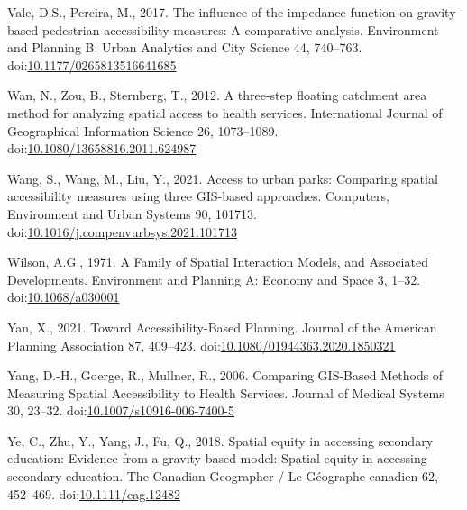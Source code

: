\documentclass[]{elsarticle} %
\newlength{\cslhangindent}
\newlength{\cslentryspacingunit} %
\newenvironment{CSLReferences}[2] %
 {%
  \setlength{\parindent}{0pt}
  \ifodd #1
  \let\oldpar\par
  \def\par{\hangindent=\cslhangindent\oldpar}
  \fi
  \setlength{\parskip}{#2\cslentryspacingunit}
 }%
 {}
\begin{document}
\begin{CSLReferences}{1}{0}
\leavevmode{}%
Vale, D.S., Pereira, M., 2017. The influence of the impedance function
on gravity-based pedestrian accessibility measures: {A} comparative
analysis. Environment and Planning B: Urban Analytics and City Science
44, 740--763.
doi:\href{https://doi.org/10.1177/0265813516641685}{10.1177/0265813516641685}

\leavevmode{}%
Wan, N., Zou, B., Sternberg, T., 2012. A three-step floating catchment
area method for analyzing spatial access to health services.
International Journal of Geographical Information Science 26,
1073--1089.
doi:\href{https://doi.org/10.1080/13658816.2011.624987}{10.1080/13658816.2011.624987}

\leavevmode{}%
Wang, S., Wang, M., Liu, Y., 2021. Access to urban parks: {Comparing}
spatial accessibility measures using three {GIS}-based approaches.
Computers, Environment and Urban Systems 90, 101713.
doi:\href{https://doi.org/10.1016/j.compenvurbsys.2021.101713}{10.1016/j.compenvurbsys.2021.101713}

\leavevmode{}%
Wilson, A.G., 1971. A Family of Spatial Interaction Models, and
Associated Developments. Environment and Planning A: Economy and Space
3, 1--32. doi:\href{https://doi.org/10.1068/a030001}{10.1068/a030001}

\leavevmode{}%
Yan, X., 2021. Toward Accessibility-Based Planning. Journal of the
American Planning Association 87, 409--423.
doi:\href{https://doi.org/10.1080/01944363.2020.1850321}{10.1080/01944363.2020.1850321}

\leavevmode{}%
Yang, D.-H., Goerge, R., Mullner, R., 2006. Comparing {GIS}-{Based}
{Methods} of {Measuring} {Spatial} {Accessibility} to {Health}
{Services}. Journal of Medical Systems 30, 23--32.
doi:\href{https://doi.org/10.1007/s10916-006-7400-5}{10.1007/s10916-006-7400-5}

\leavevmode{}%
Ye, C., Zhu, Y., Yang, J., Fu, Q., 2018. Spatial equity in accessing
secondary education: {Evidence} from a gravity-based model: {Spatial}
equity in accessing secondary education. The Canadian Geographer / Le
Géographe canadien 62, 452--469.
doi:\href{https://doi.org/10.1111/cag.12482}{10.1111/cag.12482}

\end{CSLReferences}
\end{document}
